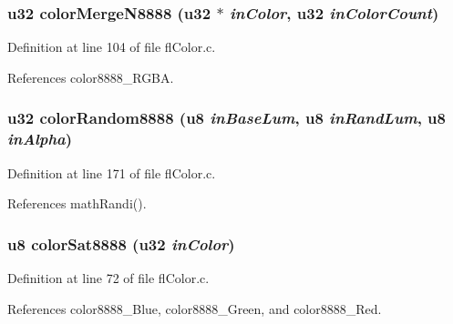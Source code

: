 \subsubsection{\setlength{\rightskip}{0pt plus 5cm}u32 color\-Merge\-N8888 (u32 $\ast$ {\em in\-Color}, u32 {\em in\-Color\-Count})}\label{flColor_8c_b8b06e4b309e0490876e4c853ccbebcd}




Definition at line 104 of file fl\-Color.c.

References color8888\_\-RGBA.
\subsubsection{\setlength{\rightskip}{0pt plus 5cm}u32 color\-Random8888 (u8 {\em in\-Base\-Lum}, u8 {\em in\-Rand\-Lum}, u8 {\em in\-Alpha})}\label{flColor_8c_30cd44a08fded741a0764165d2062f45}




Definition at line 171 of file fl\-Color.c.

References math\-Randi().
\subsubsection{\setlength{\rightskip}{0pt plus 5cm}u8 color\-Sat8888 (u32 {\em in\-Color})}\label{flColor_8c_7c525628b898faa9a99e217c0232c4d7}




Definition at line 72 of file fl\-Color.c.

References color8888\_\-Blue, color8888\_\-Green, and color8888\_\-Red.